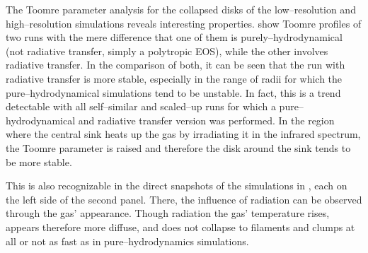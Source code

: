 The Toomre parameter analysis for the collapsed disks of the low--resolution and high--resolution simulations reveals interesting properties.
 show Toomre profiles of two runs with the mere difference that one of them is purely--hydrodynamical (not radiative transfer, simply a polytropic EOS), while the other involves radiative transfer.
In the comparison of both, it can be seen that the run with radiative transfer is more stable, especially in the range of radii for which the pure--hydrodynamical simulations tend to be unstable.
In fact, this is a trend detectable with all self--similar and scaled--up runs for which a pure--hydrodynamical and radiative transfer version was performed.
In the region where the central sink heats up the gas by irradiating it in the infrared spectrum, the Toomre parameter is raised and therefore the disk around the sink tends to be more stable.

This is also recognizable in the direct snapshots of the simulations in , each on the left side of the second panel.
There, the influence of radiation can be observed through the gas' appearance.
Though radiation the gas' temperature rises, appears therefore more diffuse, and does not collapse to filaments and clumps at all or not as fast as in pure--hydrodynamics simulations.

